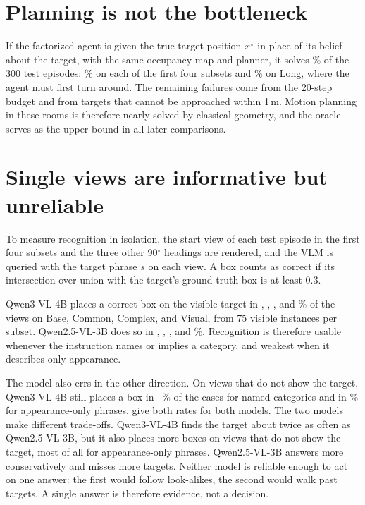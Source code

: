 \section{Planning is not the bottleneck}
\label{sec:diag-oracle}
If the factorized agent is given the true target position $x^\star$ in place of its belief about the target, with
the same occupancy map and planner, it solves \nOracle\% of the 300 test episodes: \nOracleBase\% on each of the first
four subsets and \nOracleLong\% on Long, where the agent must first turn around. The remaining failures come from the
20-step budget and from targets that cannot be approached within 1\,m. Motion planning in these rooms is therefore
nearly solved by classical geometry, and the oracle serves as the upper bound in all later comparisons.

\section{Single views are informative but unreliable}
\label{sec:diag-probe}
To measure recognition in isolation, the start view of each test episode in the first four subsets and the three
other 90$^\circ$ headings are rendered, and the VLM is queried with the target phrase $s$ on each view. A box counts
as correct if its intersection-over-union with the target's ground-truth box is at least 0.3.

Qwen3-VL-4B places a correct box on the visible target in \nProbeThreeBase, \nProbeThreeCommon, \nProbeThreeComplex,
and \nProbeThreeVisual\% of the views on Base, Common, Complex, and Visual, from 75 visible instances per subset.
Qwen2.5-VL-3B does so in \nProbeTwoBase, \nProbeTwoCommon, \nProbeTwoComplex, and \nProbeTwoVisual\%. Recognition is
therefore usable whenever the instruction names or implies a category, and weakest when it describes only appearance.

The model also errs in the other direction. On views that do not show the target, Qwen3-VL-4B still places a box in
\nFalseBoxNamedLo--\nFalseBoxNamedHi\% of the cases for named categories and in \nFalseBoxVisual\% for appearance-only
phrases.  give both rates for both models. The two models make different trade-offs.
Qwen3-VL-4B finds the target about twice as often as Qwen2.5-VL-3B, but it also places more boxes on views that do
not show the target, most of all for appearance-only phrases. Qwen2.5-VL-3B answers more conservatively and misses
more targets. Neither model is reliable enough to act on one answer: the first would follow look-alikes, the second
would walk past targets. A single answer is therefore evidence, not a decision.

